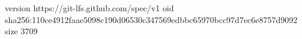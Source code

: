 version https://git-lfs.github.com/spec/v1
oid sha256:110ce4912faae5098c190d06530c347569edbbc65970bcc97d7ec6e8757d9092
size 3709
